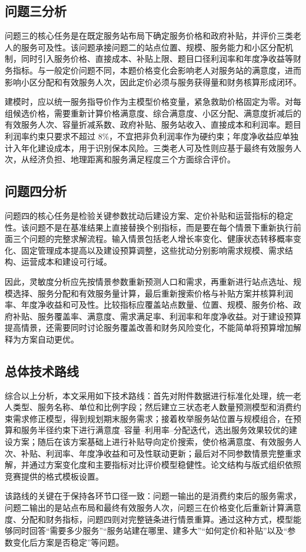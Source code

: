 \subsection{问题三分析}

问题三的核心任务是在既定服务站布局下确定服务价格和政府补贴，并评价三类老人的服务可及性。该问题承接问题二的站点位置、规模、服务能力和小区分配机制，同时引入服务价格、直接成本、补贴上限、题目口径利润率和年度净收益等财务指标。与一般定价问题不同，本题价格变化会影响老人对服务站的满意度，进而影响小区分配和有效服务人次，因此定价必须与服务获得量和财务核算形成闭环。

建模时，应以统一服务指导价作为主模型价格变量，紧急救助价格固定为零。对每组候选价格，需要重新计算价格满意度、综合满意度、小区分配、满意度折减后的有效服务人次、容量折减系数、政府补贴、服务站收入、直接成本和利润率。题目利润率约束只要求不超过 $8\%$，不宜把非负利润率作为硬约束；年度净收益应单独计入年化建设成本，用于识别保本风险。三类老人可及性则应基于最终有效服务人次，从经济负担、地理距离和服务满足程度三个方面综合评价。

\subsection{问题四分析}

问题四的核心任务是检验关键参数扰动后建设方案、定价补贴和运营指标的稳定性。该问题不是在基准结果上直接替换个别指标，而是要在每个情景下重新执行前面三个问题的完整求解流程。输入情景包括老人增长率变化、健康状态转移概率变化、固定管理成本提高以及建设预算调整，这些扰动分别影响需求规模、需求结构、运营成本和建设可行域。

因此，灵敏度分析应先按情景参数重新预测人口和需求，再重新进行站点选址、规模选择、服务分配和有效服务量计算，最后重新搜索价格与补贴方案并核算利润率、年度净收益和可及性。比较指标应覆盖站点数量、位置、规模、服务价格、政府补贴、服务覆盖率、满意度、需求满足率、利润率和年度净收益。对于建设预算提高情景，还需要同时讨论服务覆盖改善和财务风险变化，不能简单将预算增加解释为方案自动更优。

\subsection{总体技术路线}

综合以上分析，本文采用如下技术路线：首先对附件数据进行标准化处理，统一老人类型、服务名称、单位和比例字段；然后建立三状态老人数量预测模型和消费约束需求修正模型，得到规划期末服务需求；接着枚举服务站位置与规模组合，在预算和服务半径约束下进行满意度--容量--利用率--分配迭代，选出服务效果较优的建设方案；随后在该方案基础上进行补贴导向定价搜索，使价格满意度、有效服务人次、补贴、利润率、年度净收益和可及性联动更新；最后对不同参数情景完整重求解，并通过方案变化度和主要指标对比评价模型稳健性。论文结构与版式组织依照竞赛提供的格式模板设置。

该路线的关键在于保持各环节口径一致：问题一输出的是消费约束后的服务需求，问题二输出的是站点布局和最终有效服务人次，问题三在价格变化后重新计算满意度、分配和财务指标，问题四则对完整链条进行情景重算。通过这种方式，模型能够同时回答“需要多少服务”“服务站建在哪里、建多大”“如何定价和补贴”以及“参数变化后方案是否稳定”等问题。
